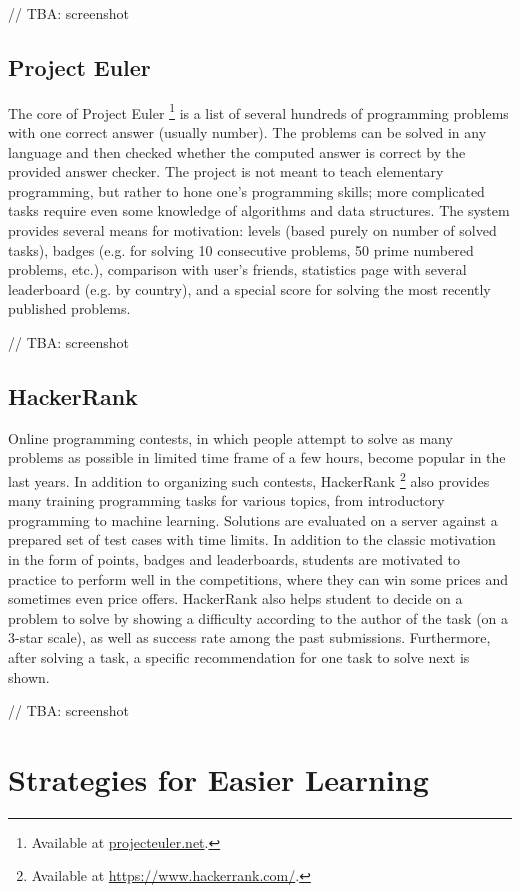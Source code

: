\documentclass[
    digital,    %
    oneside,    %
    color,
    11pt,
    nocover,
    notable,
    nolof,
    nolot,
    final
]{fithesis3}
\begin{document}
// TBA: screenshot


\subsection{Project Euler}
\label{sec:project-euler}
The core of Project Euler%
\footnote{Available at \url{projecteuler.net}.}
is a list of several hundreds of programming problems with one correct answer (usually number).
The problems can be solved in any language
and then checked whether the computed answer is correct by the provided answer checker.
The project is not meant to teach elementary programming,
but rather to hone one’s programming skills;
more complicated tasks require even some knowledge of algorithms and data structures.
The system provides several means for motivation:
levels (based purely on number of solved tasks), badges
(e.g. for solving 10 consecutive problems, 50 prime numbered problems, etc.),
comparison with user’s friends,
statistics page with several leaderboard (e.g. by country),
and a special score for solving the most recently published problems.

// TBA: screenshot


\subsection{HackerRank}
\label{sec:hacker-rank}

Online programming contests,
in which people attempt to solve as many problems as possible
in limited time frame of a few hours,
become popular in the last years.
In addition to organizing such contests,
HackerRank%
\footnote{Available at \url{https://www.hackerrank.com/}.}
also provides many training programming tasks for various topics,
from introductory programming to machine learning.
Solutions are evaluated on a server against a prepared set of test cases with time limits.
In addition to the classic motivation in the form of points, badges and leaderboards, students are motivated to practice to perform well in the competitions,
where they can win some prices and sometimes even price offers.
HackerRank also helps student to decide on a problem to solve by showing a difficulty according to the author of the task (on a 3-star scale),
as well as success rate among the past submissions.
Furthermore, after solving a task,
a specific recommendation for one task to solve next is shown.

// TBA: screenshot


\section{Strategies for Easier Learning}
\label{sec:strategies-for-easier-learning}
\end{document}
